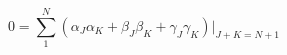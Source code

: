 \begin{equation}
\label{ident1}
0=\sum_1^N(\alpha_J\alpha_K+\beta_J\beta_K+\gamma_J\gamma_K)|_{J+K=N+1}
\end{equation}

